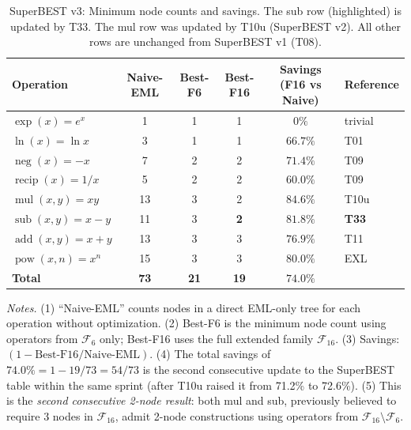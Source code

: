 \documentclass[12pt,a4paper]{article}
\theoremstyle{definition}
\begin{document}
\begin{table}[h]
\centering
\caption{SuperBEST v3: Minimum node counts and savings.
         The sub row (highlighted) is updated by T33.
         The mul row was updated by T10u (SuperBEST v2).
         All other rows are unchanged from SuperBEST v1 (T08).}
\label{tab:superbest3}
\smallskip
\begin{tabular}{@{}lccccl@{}}
\toprule
\textbf{Operation} & \textbf{Naive-EML} & \textbf{Best-F6} &
\textbf{Best-F16} & \textbf{Savings (F16 vs Naive)} & \textbf{Reference} \\
\midrule
$\operatorname{exp}(x)=e^x$        & 1  & 1 & 1 & $0\%$             & trivial \\
$\operatorname{ln}(x)=\ln x$       & 3  & 1 & 1 & $66.7\%$          & T01 \\
$\operatorname{neg}(x)=-x$         & 7  & 2 & 2 & $71.4\%$          & T09 \\
$\operatorname{recip}(x)=1/x$      & 5  & 2 & 2 & $60.0\%$          & T09 \\
$\operatorname{mul}(x,y)=xy$       & 13 & 3 & 2 & $84.6\%$          & T10u \\
$\operatorname{sub}(x,y)=x-y$      & 11 & 3 & \textbf{2} & $\mathbf{81.8\%}$ & \textbf{T33} \\
$\operatorname{add}(x,y)=x+y$      & 13 & 3 & 3 & $76.9\%$          & T11 \\
$\operatorname{pow}(x,n)=x^n$      & 15 & 3 & 3 & $80.0\%$          & EXL \\
\midrule
\textbf{Total}                     & \textbf{73} & \textbf{21} & \textbf{19} &
  $\mathbf{74.0\%}$ & \\
\bottomrule
\end{tabular}

\smallskip
\footnotesize{%
\textit{Notes.}
(1) ``Naive-EML'' counts nodes in a direct EML-only tree for each operation
without optimization.
(2) Best-F6 is the minimum node count using operators from $\mathcal{F}_6$ only;
Best-F16 uses the full extended family $\mathcal{F}_{16}$.
(3) Savings: $(1 - \text{Best-F16}/\text{Naive-EML})$.
(4) The total savings of $74.0\% = 1 - 19/73 = 54/73$ is the second consecutive
update to the SuperBEST table within the same sprint (after T10u raised it from
71.2\% to 72.6\%).
(5) This is the \emph{second consecutive 2-node result}: both mul and sub,
previously believed to require 3 nodes in $\mathcal{F}_{16}$, admit 2-node
constructions using operators from $\mathcal{F}_{16}\setminus\mathcal{F}_6$.
}
\end{table}
\end{document}
